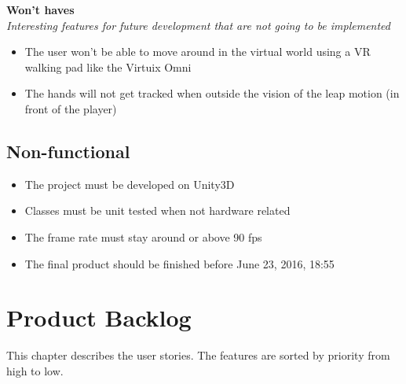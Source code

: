 \documentclass[11pt,a4paper]{report}
\begin{document}
\textbf{Won't haves} \\
\textit{Interesting features for future development that are not going to be implemented}
\begin{itemize}
\item The user won’t be able to move around in the virtual world using a VR walking pad like the Virtuix Omni
\item The hands will not get tracked when outside the vision of the leap motion (in front of the player)
\end{itemize}
\section{Non-functional}
\begin{itemize}
\item The project must be developed on Unity3D
\item Classes must be unit tested when not hardware related
\item The frame rate must stay around or above 90 fps
\item The final product should be finished before June 23, 2016, 18:55
\end{itemize}

\chapter{Product Backlog}
This chapter describes the user stories. The features are sorted by priority from high to low.
\end{document}
